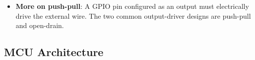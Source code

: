 \documentclass{report}
\begin{document}
\begin{itemize}
\begin{itemize}
                \item \(V_{CC}\) / \(V_{EE}\): The equivalents used in bipolar junction transistor (BJT) circuits. \(V_{CC}\) stands for Voltage at the Collector (positive), and \(V_{EE}\) stands for Voltage at the Emitter (negative/ground).
            \end{itemize}
        \item \textbf{More on push-pull}: A GPIO pin configured as an output must electrically drive the external wire. The two common output-driver designs are push-pull and open-drain.


    \end{itemize}

    \pagebreak 
    \subsection{MCU Architecture}
\end{document}
